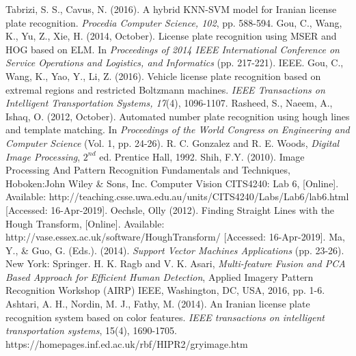 \begin{thebibliography}{7}

{Tabrizi, S. S., Cavus, N. (2016). A hybrid KNN-SVM model for Iranian license plate recognition. \emph{Procedia Computer Science, 102}, pp. 588-594.}
{Gou, C., Wang, K., Yu, Z., Xie, H. (2014, October). License plate recognition using MSER and HOG based on ELM. In \emph{Proceedings of 2014 IEEE International Conference on Service Operations and Logistics, and Informatics} (pp. 217-221). IEEE.}
{Gou, C., Wang, K., Yao, Y., Li, Z. (2016). Vehicle license plate recognition based on extremal regions and restricted Boltzmann machines. \emph{IEEE Transactions on Intelligent Transportation Systems, 17}(4), 1096-1107.}
{Rasheed, S., Naeem, A., Ishaq, O. (2012, October). Automated number plate recognition using hough lines and template matching. In \emph{Proceedings of the World Congress on Engineering and Computer Science} (Vol. 1, pp. 24-26).}
{R. C. Gonzalez and R. E. Woods, \emph{Digital Image Processing}, $2^{nd}$ ed. Prentice Hall, 1992.}
{Shih, F.Y. (2010). Image Processing And Pattern Recognition Fundamentals and Techniques, Hoboken:John Wiley \& Sons, Inc.}
{Computer Vision CITS4240: Lab 6, [Online]. Available: http://teaching.csse.uwa.edu.au/units/CITS4240/Labs/Lab6/lab6.html [Accessed: 16-Apr-2019].}
{Oechsle, Olly (2012). Finding Straight Lines with the Hough Transform, [Online]. Available: http://vase.essex.ac.uk/software/HoughTransform/ [Accessed: 16-Apr-2019].}
{Ma, Y., \& Guo, G. (Eds.). (2014). \textit{Support Vector Machines Applications} (pp. 23-26). New York: Springer.}
{H. K. Ragb and V. K. Asari, \emph{Multi-feature Fusion and PCA Based Approach for Efficient Human Detection}, Applied Imagery Pattern Recognition Workshop (AIRP) IEEE, Washington, DC, USA, 2016, pp. 1-6.}
{Ashtari, A. H., Nordin, M. J., Fathy, M. (2014). An Iranian license plate recognition system based on color features. \emph{IEEE transactions on intelligent transportation systems}, 15(4), 1690-1705.}
{https://homepages.inf.ed.ac.uk/rbf/HIPR2/gryimage.htm}


\end{thebibliography}
